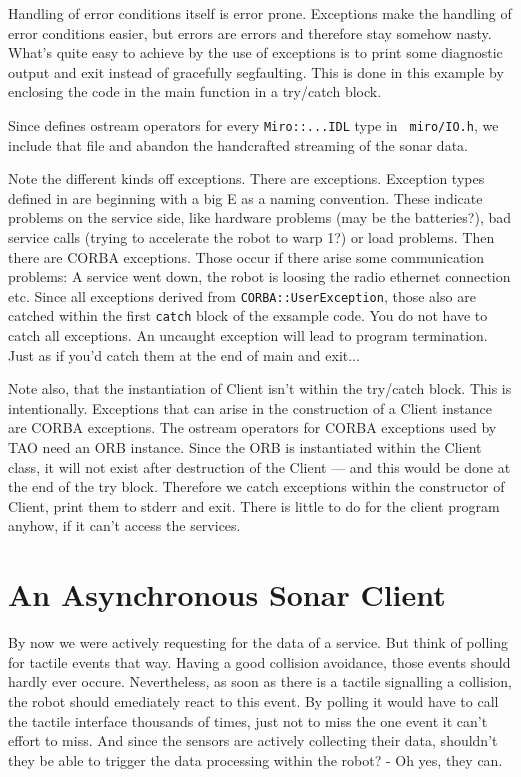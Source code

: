 Handling of error conditions itself is error prone. Exceptions make
the handling of error conditions easier, but errors are errors and
therefore stay somehow nasty. What's quite easy to achieve by the use
of exceptions is to print some diagnostic output and exit instead of
gracefully segfaulting. This is done in this example by enclosing the
code in the main function in a try/catch block.

Since \miro defines ostream operators for every \lstinline!Miro::...IDL!
type in \lstinline! miro/IO.h!, we include that file and abandon the
handcrafted streaming of the sonar data.

Note the different kinds off exceptions. There are \miro exceptions.
Exception types defined in \miro are beginning with a big E as a
naming convention. These indicate problems on the service side, like
hardware problems (may be the batteries?), bad service calls (trying
to accelerate the robot to warp 1?) or load problems. Then there are
CORBA exceptions. Those occur if there arise some communication
problems: A service went down, the robot is loosing the radio ethernet
connection etc. Since all \miro
exceptions derived from \lstinline!CORBA::UserException!, those also
are catched within the first \lstinline!catch! block of the exsample
code. You do not have to catch all exceptions. An uncaught exception
will lead to program termination. Just as if you'd catch them at the
end of main and exit...

Note also, that the instantiation of Client isn't within the try/catch
block. This is intentionally. Exceptions that can arise in the
construction of a Client instance are CORBA exceptions. The ostream
operators for CORBA exceptions used by TAO need an ORB
instance. Since the ORB is instantiated within the Client class, it
will not exist after destruction of the Client --- and this would be
done at the end of the try block. Therefore we catch exceptions within
the constructor of Client, print them to stderr and exit. There is
little to do for the client program anyhow, if it can't access the
services. 



\section{An Asynchronous Sonar Client}
\label{sec:notify}

By now we were actively requesting for the data of a service. But
think of polling for tactile events that way. Having a good collision
avoidance, those events should hardly ever occure. Nevertheless, as
soon as there is a tactile signalling a collision, the robot should
emediately react to this event. By polling it would have to call the
tactile interface thousands of times, just not to miss the one event
it can't effort to miss. And since the sensors are actively collecting
their data, shouldn't they be able to trigger the data processing
within the robot? - Oh yes, they can.

